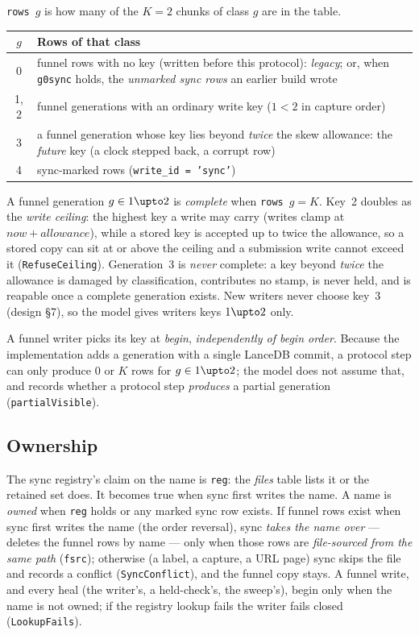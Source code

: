 \documentclass[a4paper,10pt,fleqn]{article}
\newcommand{\field}[1]{\texttt{#1}}
\begin{document}
\field{rows}~$g$ is how many of the $K=2$ chunks of class $g$ are in the table.

\begin{center}
\begin{tabular}{@{}cl@{}}
\toprule
$g$ & Rows of that class \\
\midrule
0 & funnel rows with no key (written before this protocol): \emph{legacy}; or,
    when \field{g0sync} holds, the \emph{unmarked sync rows} an earlier build
    wrote \\
1, 2 & funnel generations with an ordinary write key ($1<2$ in capture order) \\
3 & a funnel generation whose key lies beyond \emph{twice} the skew
    allowance: the \emph{future} key (a clock stepped back, a corrupt row) \\
4 & sync-marked rows (\field{write\_id = 'sync'}) \\
\bottomrule
\end{tabular}
\end{center}

A funnel generation $g\in 1\upto2$ is \emph{complete} when
\field{rows}~$g=K$. Key~2 doubles as the \emph{write ceiling}: the highest key
a write may carry (writes clamp at $\mathit{now}+\mathit{allowance}$), while a
stored key is accepted up to twice the allowance, so a stored copy can sit at or
above the ceiling and a submission write cannot exceed it (\field{RefuseCeiling}).
Generation~3 is \emph{never} complete: a key beyond \emph{twice} the allowance is
damaged by classification, contributes no stamp, is never held, and is
reapable once a complete generation exists. New writers never choose key~3
(design \S7), so the model gives writers keys $1\upto2$ only.

A funnel writer picks its key at \emph{begin}, \emph{independently of begin
order}. Because the implementation adds a generation with a single LanceDB
commit, a protocol step can only produce $0$ or $K$ rows for $g\in1\upto2$;
the model does not assume that, and records whether a protocol step
\emph{produces} a partial generation (\field{partialVisible}).

\subsection{Ownership}

The sync registry's claim on the name is \field{reg}: the \emph{files} table
lists it or the retained set does. It becomes true when sync first writes the
name. A name is \emph{owned} when \field{reg} holds or any marked sync row
exists. If funnel rows exist when sync first writes the name (the order
reversal), sync \emph{takes the name over} --- deletes the funnel rows by name
--- only when those rows are \emph{file-sourced from the same path}
(\field{fsrc}); otherwise (a label, a capture, a URL page) sync skips the file
and records a conflict (\field{SyncConflict}), and the funnel copy stays. A
funnel write, and every heal (the writer's, a held-check's, the sweep's), begin
only when the name is not owned; if the registry lookup fails the writer fails
closed (\field{LookupFails}).
\end{document}
